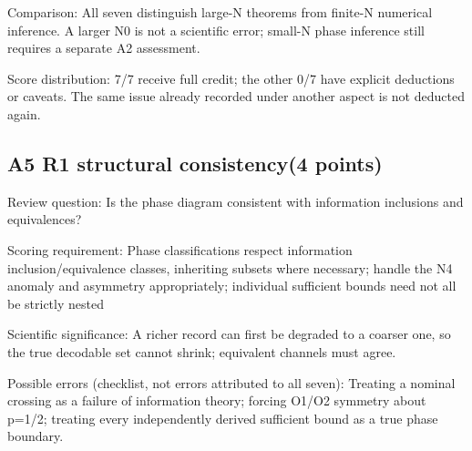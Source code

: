 \documentclass[11pt,a4paper]{article}
\begin{document}
Comparison: All seven distinguish large-N theorems from finite-N numerical inference. A larger N0 is not a scientific error; small-N phase inference still requires a separate A2 assessment.

Score distribution: 7/\allowbreak{}7 receive full credit; the other 0/\allowbreak{}7 have explicit deductions or caveats. The same issue already recorded under another aspect is not deducted again.

\clearpage
\subsection{A5 R1 structural consistency(4 points)}
\label{aspect:A5}
Review question: Is the phase diagram consistent with information inclusions and equivalences?

Scoring requirement: Phase classifications respect information inclusion/\allowbreak{}equivalence classes,\allowbreak{} inheriting subsets where necessary; handle the N4 anomaly and asymmetry appropriately; individual sufficient bounds need not all be strictly nested

Scientific significance: A richer record can first be degraded to a coarser one,\allowbreak{} so the true decodable set cannot shrink; equivalent channels must agree.

Possible errors (checklist,\allowbreak{} not errors attributed to all seven): Treating a nominal crossing as a failure of information theory; forcing O1/\allowbreak{}O2 symmetry about p=1/\allowbreak{}2; treating every independently derived sufficient bound as a true phase boundary.
\end{document}

